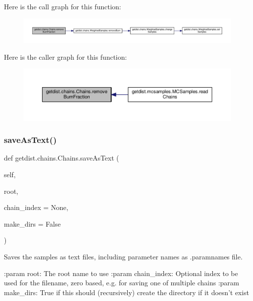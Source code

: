 Here is the call graph for this function\+:
\nopagebreak
\begin{figure}[H]
\begin{center}
\leavevmode
\includegraphics[width=350pt]{classgetdist_1_1chains_1_1Chains_afdf14ad21843a394732184ae26433d6e_cgraph}
\end{center}
\end{figure}
Here is the caller graph for this function\+:
\nopagebreak
\begin{figure}[H]
\begin{center}
\leavevmode
\includegraphics[width=350pt]{classgetdist_1_1chains_1_1Chains_afdf14ad21843a394732184ae26433d6e_icgraph}
\end{center}
\end{figure}
\mbox{\label{classgetdist_1_1chains_1_1Chains_a9fdaed252edbe3a4fceb8c139b49b911}} 
\subsubsection{\texorpdfstring{save\+As\+Text()}{saveAsText()}}
{\footnotesize\ttfamily def getdist.\+chains.\+Chains.\+save\+As\+Text (\begin{DoxyParamCaption}\item[{}]{self,  }\item[{}]{root,  }\item[{}]{chain\+\_\+index = {\ttfamily None},  }\item[{}]{make\+\_\+dirs = {\ttfamily False} }\end{DoxyParamCaption})}

\begin{DoxyVerb}Saves the samples as text files, including parameter names as .paramnames file. 

:param root: The root name to use
:param chain_index: Optional index to be used for the filename, zero based, e.g. for saving one of multiple chains
:param make_dirs: True if this should (recursively) create the directory if it doesn't exist
\end{DoxyVerb}
 

